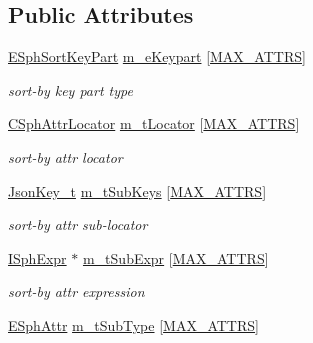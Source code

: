 \subsection*{Public Attributes}
\begin{DoxyCompactItemize}
\item 
\hyperlink{sphinx_8h_aac27c366506093037ef354974cf5d0a0}{E\-Sph\-Sort\-Key\-Part} \hyperlink{structCSphMatchComparatorState_a0e0ab7b86cc6dcf782f0c44dba949495}{m\-\_\-e\-Keypart} \mbox{[}\hyperlink{structCSphMatchComparatorState_a2537521712fc482d4d5a06cb24e27995}{M\-A\-X\-\_\-\-A\-T\-T\-R\-S}\mbox{]}
\begin{DoxyCompactList}\small\item\em sort-\/by key part type \end{DoxyCompactList}\item 
\hyperlink{structCSphAttrLocator}{C\-Sph\-Attr\-Locator} \hyperlink{structCSphMatchComparatorState_a08841e269f9cfc9e6d8aa698dc8ad9fc}{m\-\_\-t\-Locator} \mbox{[}\hyperlink{structCSphMatchComparatorState_a2537521712fc482d4d5a06cb24e27995}{M\-A\-X\-\_\-\-A\-T\-T\-R\-S}\mbox{]}
\begin{DoxyCompactList}\small\item\em sort-\/by attr locator \end{DoxyCompactList}\item 
\hyperlink{structJsonKey__t}{Json\-Key\-\_\-t} \hyperlink{structCSphMatchComparatorState_a76a5f5712b5cb523d0072a50c5ee0866}{m\-\_\-t\-Sub\-Keys} \mbox{[}\hyperlink{structCSphMatchComparatorState_a2537521712fc482d4d5a06cb24e27995}{M\-A\-X\-\_\-\-A\-T\-T\-R\-S}\mbox{]}
\begin{DoxyCompactList}\small\item\em sort-\/by attr sub-\/locator \end{DoxyCompactList}\item 
\hyperlink{structISphExpr}{I\-Sph\-Expr} $\ast$ \hyperlink{structCSphMatchComparatorState_a0a3dca4e697aafc3619015e613e2259a}{m\-\_\-t\-Sub\-Expr} \mbox{[}\hyperlink{structCSphMatchComparatorState_a2537521712fc482d4d5a06cb24e27995}{M\-A\-X\-\_\-\-A\-T\-T\-R\-S}\mbox{]}
\begin{DoxyCompactList}\small\item\em sort-\/by attr expression \end{DoxyCompactList}\item 
\hyperlink{sphinxexpr_8h_aa883df0db2e4468a107fdd2d2ae625a3}{E\-Sph\-Attr} \hyperlink{structCSphMatchComparatorState_ace03d56e87da138c809986ea6bfa77f6}{m\-\_\-t\-Sub\-Type} \mbox{[}\hyperlink{structCSphMatchComparatorState_a2537521712fc482d4d5a06cb24e27995}{M\-A\-X\-\_\-\-A\-T\-T\-R\-S}\mbox{]}

\end{DoxyCompactItemize}

